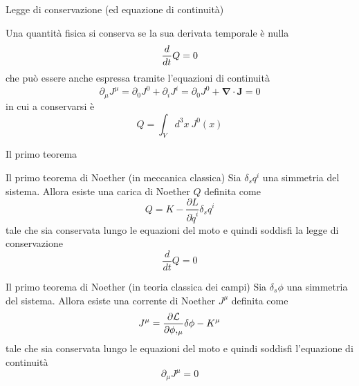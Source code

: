 \begin{frame}{Legge di conservazione (ed equazione di continuità)}
    
    Una quantità fisica si conserva se la sua derivata temporale è nulla
    \begin{equation*}
        \frac{d}{dt} Q = 0
    \end{equation*} 
    che può essere anche espressa tramite l'equazioni di continuità 
    \begin{equation*}
        \partial_\mu J^\mu = \partial_0 J^0 + \partial_i J^i = \partial_0 J^0 + \boldsymbol \nabla \cdot \mathbf J = 0
    \end{equation*}
    in cui a conservarsi è 
    \begin{equation*}
        Q = \int_V d^3 x ~ J^0(x)
    \end{equation*}
    
\end{frame}

\begin{frame}{Il primo teorema}
    
    \begin{block}{Il primo teorema di Noether (in meccanica classica)} 
        Sia $\delta_s q^i$ una simmetria del sistema. Allora esiste una carica di Noether $Q$ definita come
        \begin{equation*}
            Q = K - \frac{\partial L}{\partial \dot q^i} \delta_s q^i
        \end{equation*}
            tale che sia conservata lungo le equazioni del moto e quindi soddisfi la legge di conservazione
        \begin{equation*} 
            \frac{d}{dt} Q = 0
        \end{equation*}
    \end{block}

\end{frame}
\begin{frame}

    \begin{block}{Il primo teorema di Noether (in teoria classica dei campi)} 
        Sia $\delta_s \phi$ una simmetria del sistema. Allora esiste una corrente di Noether $J^\mu$ definita come
        \begin{equation*}
            J^\mu = \frac{\partial\mathcal L}{\partial\phi,_\mu} \delta \phi - K^\mu
        \end{equation*}
            tale che sia conservata lungo le equazioni del moto e quindi soddisfi l'equazione di continuità
        \begin{equation*} 
            \partial_\mu J^\mu = 0
        \end{equation*}
    \end{block}
    
\end{frame}

